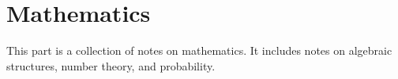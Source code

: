 \part{Mathematics}
This part is a collection of notes on mathematics.
It includes notes on algebraic structures, number theory, and probability. 



